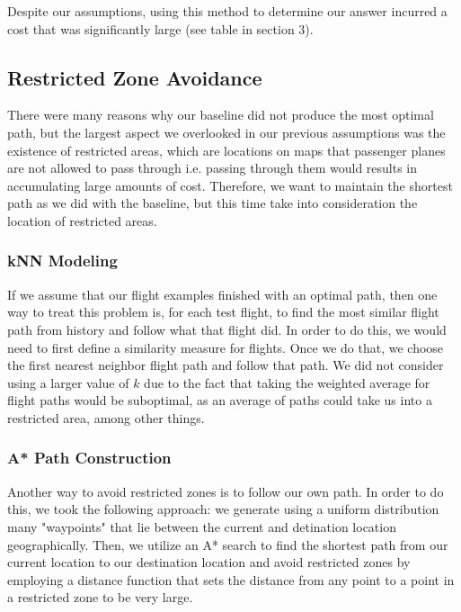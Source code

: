 \documentclass{article}[12pt]
\begin{document}
\begin{multicols}{2}
Despite our assumptions, using this method to determine our answer incurred a cost that was significantly large (see table in section 3).

\subsection{Restricted Zone Avoidance}

There were many reasons why our baseline did not produce the most optimal path, but the largest aspect we overlooked in our previous assumptions was the existence of restricted areas, which are locations on maps that passenger planes are not allowed to pass through i.e. passing through them would results in accumulating large amounts of cost. Therefore, we want to maintain the shortest path as we did with the baseline, but this time take into consideration the location of restricted areas.\\

\subsubsection{kNN Modeling}

If we assume that our flight examples finished with an optimal path, then one way to treat this problem is, for each test flight, to find the most similar flight path from history and follow what that flight did. In order to do this, we would need to first define a similarity measure for flights. Once we do that, we choose the first nearest neighbor flight path and follow that path. We did not consider using a larger value of $k$ due to the fact that taking the weighted average for flight paths would be suboptimal, as an average of paths could take us into a restricted area, among other things.

\subsubsection{A* Path Construction}

Another way to avoid restricted zones is to follow our own path. In order to do this, we took the following approach: we generate using a uniform distribution many "waypoints" that lie between the current and detination location geographically. Then, we utilize an A* search to find the shortest path from our current location to our destination location and avoid restricted zones by employing a distance function that sets the distance from any point to a point in a restricted zone to be very large.


\end{multicols}
\end{document}

